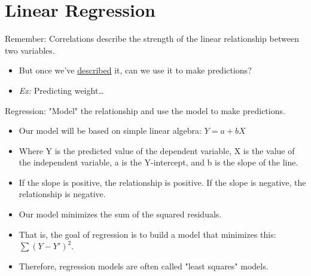 \documentclass[11pt]{report}
\begin{document}
\section{Linear Regression}
Remember: Correlations describe the strength of the linear relationship between two variables. 
\begin{itemize}
    \item But once we've \underline{described} it, can we use it to make predictions?
    \item \textit{Ex:} Predicting weight\dots
\end{itemize}
Regression: "Model" the relationship and use the model to make predictions. 
\begin{itemize}
    \item Our model will be based on simple linear algebra: $Y = a + bX$
    \item Where Y is the predicted value of the dependent variable, X is the value of the independent variable, a is the Y-intercept, and b is the slope of the line.
    \item If the slope is positive, the relationship is positive. If the slope is negative, the relationship is negative.
    \item Our model minimizes the sum of the squared residuals. 
    \item That is, the goal of regression is to build a model that minimizes this: $\sum (Y - Y')^2$.
    \item Therefore, regression models are often called "least squares" models.
\end{itemize}
\end{document}
